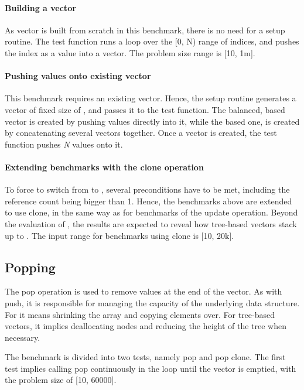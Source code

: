 \paragraph*{Building a vector}
As vector is built from scratch in this benchmark, there is no need for a setup routine. The test function runs a loop over the [0, N) range of indices, and pushes the index as a value into a vector. The problem size range is [10, 1m]. 

\paragraph*{Pushing values onto existing vector}
This benchmark requires an existing vector. Hence, the setup routine generates a vector of fixed size of , and passes it to the test function. The balanced, \rbtree{} based vector is created by pushing values directly into it, while the \rrbtree{} based one, is created by concatenating several vectors together. Once a vector is created, the test function pushes \emph{N} values onto it. 

\paragraph*{Extending benchmarks with the clone operation}
To force \pvec{} to switch from \stdvec{} to \rrbvec{}, several preconditions have to be met, including the reference count being bigger than 1. Hence, the benchmarks above are extended to use clone, in the same way as for benchmarks of the update operation. Beyond the evaluation of \pvec{}, the results are expected to reveal how tree-based vectors stack up to \stdvec{}. The input range for benchmarks using clone is [10, 20k]. 


\subsection{Popping}
The pop operation is used to remove values at the end of the vector. As with push, it is responsible for managing the capacity of the underlying data structure. For \stdvec{} it means shrinking the array and copying elements over. For tree-based vectors, it implies deallocating nodes and reducing the height of the tree when necessary. 

The benchmark is divided into two tests, namely pop and pop clone. The first test implies calling pop continuously in the loop until the vector is emptied, with the problem size of [10, 60000]. 

